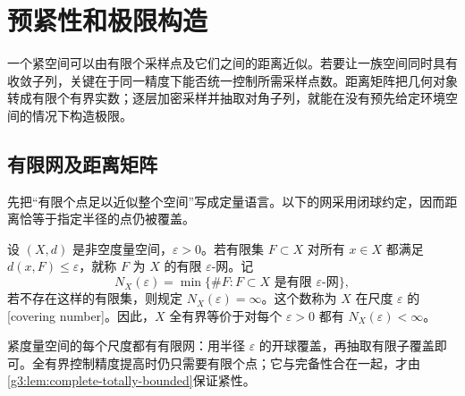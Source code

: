 
% 
% 

\section{预紧性和极限构造}
\label{g3:sec:1003}

一个紧空间可以由有限个采样点及它们之间的距离近似。若要让一族空间同时具有收敛子列，关键在于同一精度下能否统一控制所需采样点数。距离矩阵把几何对象转成有限个有界实数；逐层加密采样并抽取对角子列，就能在没有预先给定环境空间的情况下构造极限。

\subsection{有限网及距离矩阵}
\label{g3:subsec:1003:01}

先把“有限个点足以近似整个空间”写成定量语言。以下的网采用闭球约定，因而距离恰等于指定半径的点仍被覆盖。

\begin{definition}\label{g3:def:metric-covering-number}
	设 \((X,d)\) 是非空度量空间，\(\varepsilon>0\)。若有限集 \(F\subset X\) 对所有 \(x\in X\) 都满足 \(d(x,F)\le\varepsilon\)，就称 \(F\) 为 \(X\) 的有限 \(\varepsilon\)-网。记
	\[
		N_X(\varepsilon)=\min\{\#F:F\subset X\text{ 是有限 }\varepsilon\text{-网}\},
	\]
	若不存在这样的有限集，则规定 \(N_X(\varepsilon)=\infty\)。这个数称为 \(X\) 在尺度 \(\varepsilon\) 的[covering number]。因此，\(X\) 全有界等价于对每个 \(\varepsilon>0\) 都有 \(N_X(\varepsilon)<\infty\)。
\end{definition}

紧度量空间的每个尺度都有有限网：用半径 \(\varepsilon\) 的开球覆盖，再抽取有限子覆盖即可。全有界控制精度提高时仍只需要有限个点；它与完备性合在一起，才由\cref{g3:lem:complete-totally-bounded}保证紧性。

